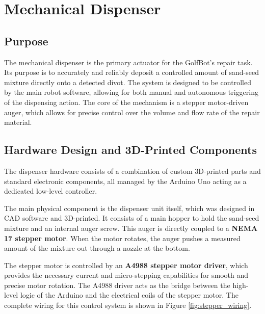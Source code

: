 \section{Mechanical Dispenser}
\label{sec:dispenser_implementation}

\subsection{Purpose}
\label{ssec:dispenser_intro}
The mechanical dispenser is the primary actuator for the GolfBot's repair task. Its purpose is to accurately and reliably deposit a controlled amount of sand-seed mixture directly onto a detected divot. The system is designed to be controlled by the main robot software, allowing for both manual and autonomous triggering of the dispensing action. The core of the mechanism is a stepper motor-driven auger, which allows for precise control over the volume and flow rate of the repair material.
\subsection{Hardware Design and 3D-Printed Components}
\label{ssec:dispenser_hardware}
The dispenser hardware consists of a combination of custom 3D-printed parts and standard electronic components, all managed by the Arduino Uno acting as a dedicated low-level controller.

The main physical component is the dispenser unit itself, which was designed in CAD software and 3D-printed. It consists of a main hopper to hold the sand-seed mixture and an internal auger screw. This auger is directly coupled to a \textbf{NEMA 17 stepper motor}. When the motor rotates, the auger pushes a measured amount of the mixture out through a nozzle at the bottom.

The stepper motor is controlled by an \textbf{A4988 stepper motor driver}, which provides the necessary current and micro-stepping capabilities for smooth and precise motor rotation. The A4988 driver acts as the bridge between the high-level logic of the Arduino and the electrical coils of the stepper motor. The complete wiring for this control system is shown in Figure \ref{fig:stepper_wiring}.

